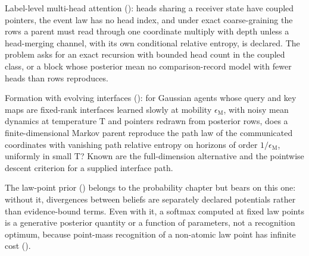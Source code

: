 Label-level multi-head attention (): heads sharing a receiver state have coupled pointers,
the event law has no head index, and under exact coarse-graining the rows a parent must read through one coordinate multiply
with depth unless a head-merging channel, with its own conditional relative entropy, is declared. The problem asks for an
exact recursion with bounded head count in the coupled class, or a block whose posterior mean no comparison-record model with
fewer heads than rows reproduces.

Formation with evolving interfaces (): for Gaussian agents whose query and key maps are
fixed-rank interfaces learned slowly at mobility $\epsilon_{\mathrm M}$, with noisy mean dynamics at temperature $\mathrm T$
and pointers redrawn from posterior rows, does a finite-dimensional Markov parent reproduce the path law of the communicated
coordinates with vanishing path relative entropy on horizons of order $1/\epsilon_{\mathrm M}$, uniformly in small
$\mathrm T$? Known are the full-dimension alternative and the pointwise descent criterion for a supplied interface path.

The law-point prior () belongs to the probability chapter but bears on this one: without it,
divergences between beliefs are separately declared potentials rather than evidence-bound terms. Even with it, a softmax
computed at fixed law points is a generative posterior quantity or a function of parameters, not a recognition optimum,
because point-mass recognition of a non-atomic law point has infinite cost ().

